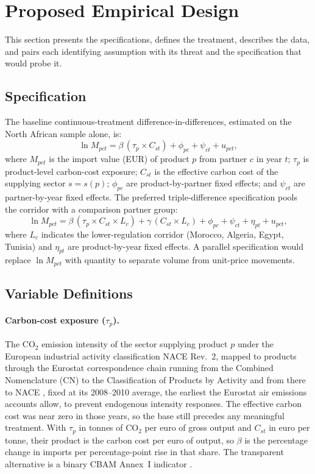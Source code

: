 \section{Proposed Empirical Design}
\label{sec:design}

This section presents the specifications, defines the treatment, describes the data, and pairs each identifying assumption with its threat and the specification that would probe it.

\subsection{Specification}

The baseline continuous-treatment difference-in-differences, estimated on the North African sample alone, is:
\begin{equation}
\label{eq:baseline}
\ln M_{pct} = \beta \, (\tau_p \times C_{st}) + \phi_{pc} + \psi_{ct} + u_{pct},
\end{equation}
where $M_{pct}$ is the import value (EUR) of product $p$ from partner $c$ in year $t$; $\tau_p$ is product-level carbon-cost exposure; $C_{st}$ is the effective carbon cost of the supplying sector $s = s(p)$; $\phi_{pc}$ are product-by-partner fixed effects; and $\psi_{ct}$ are partner-by-year fixed effects. The preferred triple-difference specification pools the corridor with a comparison partner group:
\begin{equation}
\label{eq:triple}
\ln M_{pct} = \beta \, (\tau_p \times C_{st} \times L_c) + \gamma \, (C_{st} \times L_c) + \phi_{pc} + \psi_{ct} + \eta_{pt} + u_{pct},
\end{equation}
where $L_c$ indicates the lower-regulation corridor (Morocco, Algeria, Egypt, Tunisia) and $\eta_{pt}$ are product-by-year fixed effects. A parallel specification would replace $\ln M_{pct}$ with quantity to separate volume from unit-price movements.

\subsection{Variable Definitions}

\paragraph{Carbon-cost exposure ($\tau_p$).}
The CO$_2$ emission intensity of the sector supplying product $p$ under the European industrial activity classification NACE Rev.~2, mapped to products through the Eurostat correspondence chain running from the Combined Nomenclature (CN) to the Classification of Products by Activity and from there to NACE \citep{ramon}, fixed at its 2008--2010 average, the earliest the Eurostat air emissions accounts allow, to prevent endogenous intensity responses. The effective carbon cost was near zero in those years, so the base still precedes any meaningful treatment. With $\tau_p$ in tonnes of CO$_2$ per euro of gross output and $C_{st}$ in euro per tonne, their product is the carbon cost per euro of output, so $\beta$ is the percentage change in imports per percentage-point rise in that share. The transparent alternative is a binary CBAM Annex~I indicator \citep{cbam2023}.

